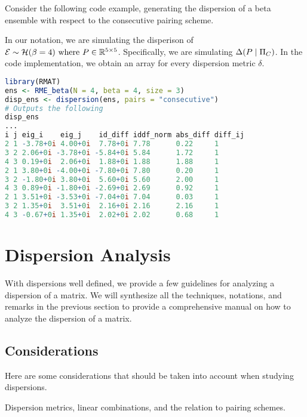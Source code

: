 Consider the following code example, generating the dispersion of a beta ensemble with respect to the consecutive pairing scheme.

\begin{code}
In our notation, we are simulating the disperison of $\mathcal{E} \sim \mathcal{H}(\beta = 4) \text{ where } P \in \mathbb{R}^{5 \times 5}$. Specifically, we are simulating $\Delta(P \mid \Pi_C)$. In the code implementation, we obtain an array for every dispersion metric $\delta$.
\end{code}
\begin{lstlisting}[language=R]
library(RMAT)
ens <- RME_beta(N = 4, beta = 4, size = 3)
disp_ens <- dispersion(ens, pairs = "consecutive")
# Outputs the following
disp_ens
...
i j eig_i    eig_j    id_diff iddf_norm abs_diff diff_ij
2 1 -3.78+0i 4.00+0i  7.78+0i 7.78      0.22     1
3 2 2.06+0i -3.78+0i -5.84+0i 5.84      1.72     1
4 3 0.19+0i  2.06+0i  1.88+0i 1.88      1.88     1
2 1 3.80+0i -4.00+0i -7.80+0i 7.80      0.20     1
3 2 -1.80+0i 3.80+0i  5.60+0i 5.60      2.00     1
4 3 0.89+0i -1.80+0i -2.69+0i 2.69      0.92     1
2 1 3.51+0i -3.53+0i -7.04+0i 7.04      0.03     1
3 2 1.35+0i  3.51+0i  2.16+0i 2.16      2.16     1
4 3 -0.67+0i 1.35+0i  2.02+0i 2.02      0.68     1
\end{lstlisting}


\section{Dispersion Analysis}

With dispersions well defined, we provide a few guidelines for analyzing a dispersion of a matrix. We will synthesize all the techniques, notations, and remarks in the previous section to provide a comprehensive manual on how to analyze the dispersion of a matrix.

\subsection{Considerations}

Here are some considerations that should be taken into account when studying dispersions.

Dispersion metrics, linear combinations, and the relation to pairing schemes.

